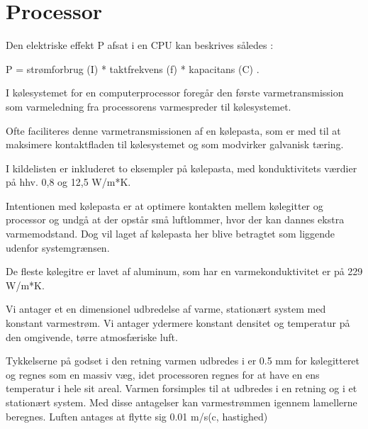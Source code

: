\section{Processor}

Den elektriske effekt P afsat i en CPU kan beskrives således :

 P = strømforbrug (I) * taktfrekvens (f) * kapacitans (C) .

 

I kølesystemet for en computerprocessor foregår den første varmetransmission som varmeledning fra processorens varmespreder til kølesystemet.

Ofte faciliteres denne varmetransmissionen af en kølepasta, som er med til at maksimere kontaktfladen til kølesystemet og som modvirker galvanisk tæring.

I kildelisten er inkluderet to eksempler på kølepasta, med konduktivitets værdier på hhv. 0,8 og 12,5 W/m*K.

Intentionen med kølepasta er at optimere kontakten mellem kølegitter og processor og undgå at der opstår små luftlommer, hvor der kan dannes ekstra varmemodstand. Dog vil laget af kølepasta her blive betragtet som liggende udenfor systemgrænsen.

De fleste kølegitre er lavet af aluminum, som har en varmekonduktivitet er på 229 W/m*K.

Vi antager et en dimensionel udbredelse af varme, stationært system med konstant varmestrøm. Vi antager ydermere konstant densitet og temperatur på den omgivende, tørre atmosfæriske luft.

Tykkelserne på godset i den retning varmen udbredes i er 0.5 mm for kølegitteret og regnes som en massiv væg, idet processoren regnes for at have en ens temperatur i hele sit areal.  Varmen forsimples til at udbredes i en retning og i et stationært system.  Med disse antagelser kan varmestrømmen igennem lamellerne beregnes.
Luften antages at flytte sig 0.01 m/s(c, hastighed)